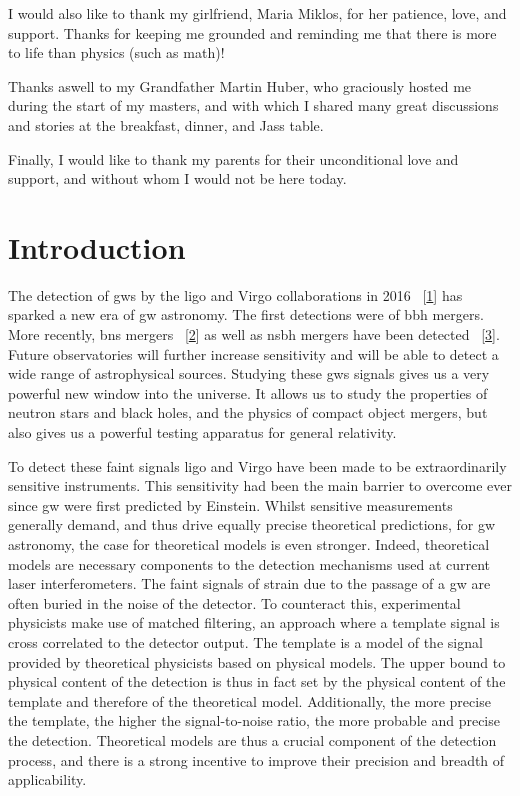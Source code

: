 \documentclass[
  11pt,
  a4paper,
  DIV=11,
  numbers=noendperiod,
  twoside]{scrreprt}
\DeclareRobustCommand{\[}{\begin{equation}}
\DeclareRobustCommand{\]}{\end{equation}}
\begin{document}
I would also like to thank my girlfriend, Maria Miklos, for her
patience, love, and support. Thanks for keeping me grounded and
reminding me that there is more to life than physics (such as math)!

Thanks aswell to my Grandfather Martin Huber, who graciously hosted me
during the start of my masters, and with which I shared many great
discussions and stories at the breakfast, dinner, and Jass table.

Finally, I would like to thank my parents for their unconditional love
and support, and without whom I would not be here today.


\hypertarget{sec-intro}{%
\chapter{Introduction}\label{sec-intro}}

The detection of \glspl{gw} by the \gls{ligo} and Virgo collaborations
in 2016 ~{[}\protect\hyperlink{ref-LIGOScientific:2016aoc}{1}{]} has
sparked a new era of \gls{gw} astronomy. The first detections were of
\gls{bbh} mergers. More recently, \gls{bns} mergers
~{[}\protect\hyperlink{ref-LIGOScientific:2017vwq}{2}{]} as well as
\gls{nsbh} mergers have been detected
~{[}\protect\hyperlink{ref-LIGOScientific:2021qlt}{3}{]}. Future
observatories will further increase sensitivity and will be able to
detect a wide range of astrophysical sources. Studying these \glspl{gw}
signals gives us a very powerful new window into the universe. It allows
us to study the properties of neutron stars and black holes, and the
physics of compact object mergers, but also gives us a powerful testing
apparatus for general relativity.

To detect these faint signals \gls{ligo} and Virgo have been made to be
extraordinarily sensitive instruments. This sensitivity had been the
main barrier to overcome ever since \gls{gw} were first predicted by
Einstein. Whilst sensitive measurements generally demand, and thus drive
equally precise theoretical predictions, for \gls{gw} astronomy, the
case for theoretical models is even stronger. Indeed, theoretical models
are necessary components to the detection mechanisms used at current
laser interferometers. The faint signals of strain due to the passage of
a \gls{gw} are often buried in the noise of the detector. To counteract
this, experimental physicists make use of matched filtering, an approach
where a template signal is cross correlated to the detector output. The
template is a model of the signal provided by theoretical physicists
based on physical models. The upper bound to physical content of the
detection is thus in fact set by the physical content of the template
and therefore of the theoretical model. Additionally, the more precise
the template, the higher the signal-to-noise ratio, the more probable
and precise the detection. Theoretical models are thus a crucial
component of the detection process, and there is a strong incentive to
improve their precision and breadth of applicability.
\end{document}
